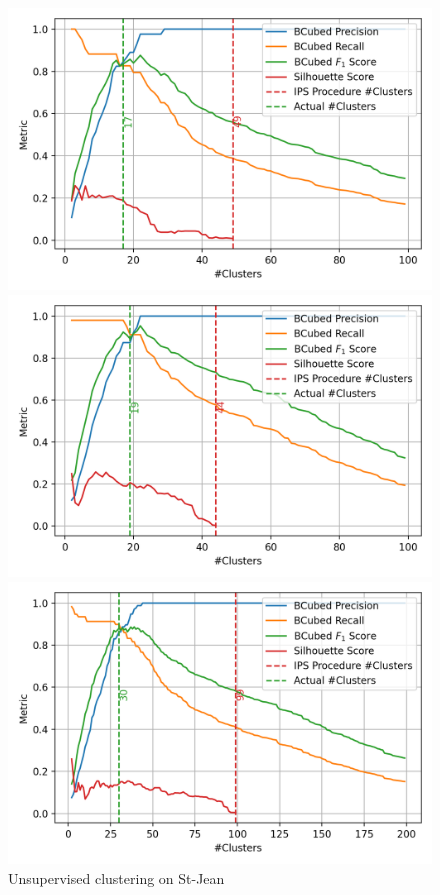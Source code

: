 \begin{figure}
  \caption{Unsupervised clustering on St-Jean}
  \label{fig:unsupervised_clustering_sj}

  \label{fig:unsupervised_clustering_st_jean_A}
  \includegraphics[width=\linewidth]{img/unsupervised_clustering_st_jean_A.png}

  \label{fig:unsupervised_clustering_st_jean_B}
  \includegraphics[width=\linewidth]{img/unsupervised_clustering_st_jean_B.png}

  \label{fig:unsupervised_clustering_st_jean}
  \includegraphics[width=\linewidth]{img/unsupervised_clustering_st_jean.png}
\end{figure}

